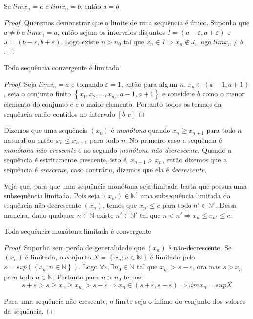\begin{theorem}
Se $lim x_{n}=a$ e $lim x_{n} = b$, então $a=b$
\end{theorem}
\begin{proof}
Queremos demonstrar que o limite de uma sequência é único. Suponha que $a \neq b$ e $lim x_{n}=a$, então sejam os intervalos disjuntos $I=(a-\varepsilon ,a+\varepsilon )$ e $J=(b-\varepsilon ,b+\varepsilon )$. Logo existe $n > n_{0}$ tal que $x_{n} \in I \Rightarrow x_{n} \notin J$, logo $lim x_{n} \neq b$. 
\end{proof}

\begin{theorem}
Toda sequência convergente é limitada
\end{theorem}
\begin{proof}
Seja $lim x_{n}=a$ e tomando $\varepsilon=1$, então para algum $n$,
$x_{n} \in (a-1,a+1)$, seja o conjunto finito $\left \{ x_{1},x_{2},...,x_{n_{0}},a-1,a+1 \right \}$ e considere $b$ como o menor elemento do conjunto e $c$ o maior elemento. Portanto todos os termos da sequência então contidos no intervalo $[b,c]$
\end{proof}
 
Dizemos que uma sequência $(x_{n})$ é \textit{monótona} quando $x_{n} \geq x_{n+1}$ para todo $n$ natural ou então $x_{n} \leq x_{n+1}$ para todo $n$. No primeiro caso a sequência é \textit{monótona não crescente} e no segundo \textit{monótona não decrescente}. Quando a sequência é estritamente crescente, isto é, $x_{n+1}>x_{n}$, então dizemos que a sequência é \textit{crescente}, caso contrário, dizemos que ela é \textit{decrescente}. 

Veja que, para que uma sequência monótona seja limitada basta que possua uma subsequência limitada. Pois seja $(x_{n'}) \in \mathbb{N}^{'}$ uma subsequência limitada da sequência não decrescente $(x_{n})$, temos que $x_{n'} \leq c$ para todo $n' \in \mathbb{N}'$. Dessa maneira, dado qualquer $n \in \mathbb{N}$ existe $n' \in \mathbb{N}'$ tal que $n < n' \Rightarrow x_{n} \leq x_{n'}\leq c$.

\begin{theorem}
Toda sequência monótona limitada é convergente
\end{theorem}
\begin{proof}
Suponha sem perda de generalidade que $(x_{n})$ é não-decrescente. Se $(x_{n})$ é limitada, o conjunto $X=\left \{ x_{n};n \in \mathbb{N} \right \}$ é limitado pelo $s=sup(\left \{ x_{n};n \in \mathbb{N} \right \})$. Logo $\forall \varepsilon, \exists n_{0} \in \mathbb{N}$ tal que $x_{n_{0}}>s-\varepsilon$, ora mas $s>x_{n}$ para todo $n \in \mathbb{N}$. Portanto para $n>n_{0}$ temos: $$s+\varepsilon >s\geq x_{n}\geq x_{n_{0}}>s-\varepsilon \Rightarrow x_{n} \in (s+\varepsilon,s-\varepsilon)\Rightarrow limx_{n}=supX$$

Para uma sequência não crescente, o limite seja o ínfimo do conjunto dos valores da sequência.
\end{proof}

